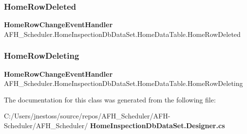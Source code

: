\mbox{\label{class_a_f_h___scheduler_1_1_home_inspection_db_data_set_1_1_home_data_table_a0d212500ca2932d99e53539441d2bb1c}} 
\subsubsection{HomeRowDeleted}
{\footnotesize\ttfamily \textbf{ Home\+Row\+Change\+Event\+Handler} A\+F\+H\+\_\+\+Scheduler.\+Home\+Inspection\+Db\+Data\+Set.\+Home\+Data\+Table.\+Home\+Row\+Deleted}

\mbox{\label{class_a_f_h___scheduler_1_1_home_inspection_db_data_set_1_1_home_data_table_afd6b6425f9994d35a7a66fb7ae3f49b8}} 
\subsubsection{HomeRowDeleting}
{\footnotesize\ttfamily \textbf{ Home\+Row\+Change\+Event\+Handler} A\+F\+H\+\_\+\+Scheduler.\+Home\+Inspection\+Db\+Data\+Set.\+Home\+Data\+Table.\+Home\+Row\+Deleting}



The documentation for this class was generated from the following file\+:\begin{DoxyCompactItemize}
\item 
C\+:/\+Users/jnestoss/source/repos/\+A\+F\+H\+\_\+\+Scheduler/\+A\+F\+H-\/\+Scheduler/\+A\+F\+H\+\_\+\+Scheduler/\textbf{ Home\+Inspection\+Db\+Data\+Set.\+Designer.\+cs}\end{DoxyCompactItemize}
